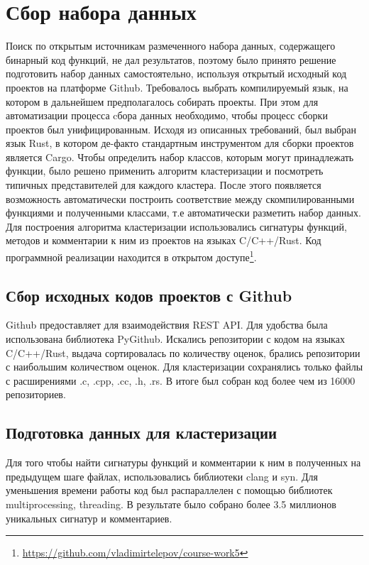 \section{Сбор набора данных} \label{5-dataset}

Поиск по открытым источникам размеченного набора данных, содержащего бинарный код функций, не дал результатов, поэтому было принято решение подготовить набор данных самостоятельно, используя открытый исходный код проектов на платформе Github. Требовалось выбрать компилируемый язык, на котором в дальнейшем предполагалось собирать проекты. При этом для автоматизации процесса cбора данных необходимо, чтобы процесс сборки проектов был унифицированным. Исходя из описанных требований, был выбран язык Rust, в котором де-факто стандартным инструментом для сборки проектов является Cargo. Чтобы определить набор классов, которым могут принадлежать функции, было решено применить алгоритм кластеризации и посмотреть типичных представителей для каждого кластера. После этого появляется возможность автоматически построить соответствие между скомпилированными функциями и полученными классами, т.е автоматически разметить набор данных. Для построения алгоритма кластеризации использовались сигнатуры функций, методов и комментарии к ним из проектов на языках C/C++/Rust. Код программной реализации находится в открытом доступе\footnote{\url{https://github.com/vladimirtelepov/course-work5}}.

\subsection{Сбор исходных кодов проектов с Github}
Github предоставляет для взаимодействия REST API. Для удобства была использована библиотека PyGithub. Искались репозитории с кодом на языках C/C++/Rust, выдача сортировалась по количеству оценок, брались репозитории с наибольшим количеством оценок. Для кластеризации сохранялись только файлы с расширениями .c, .cpp, .cc, .h, .rs. В итоге был собран код более чем из 16000 репозиториев.

\subsection{Подготовка данных для кластеризации}
Для того чтобы найти сигнатуры функций и комментарии к ним в полученных на предыдущем шаге файлах, использовались библиотеки clang и syn. Для уменьшения времени работы код был распараллелен с помощью библиотек multiprocessing, threading. В результате было собрано более 3.5 миллионов уникальных сигнатур и комментариев.

